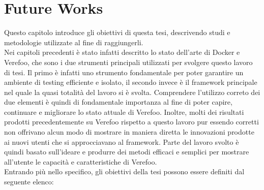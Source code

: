 \chapter{Future Works} \label{ch:FutureWorks}

Questo capitolo introduce gli obiettivi di questa tesi, descrivendo studi e metodologie utilizzate al fine di raggiungerli.\\
Nei capitoli precedenti è stato infatti descritto lo stato dell'arte di Docker e Verefoo, che sono i due strumenti principali utilizzati per
svolgere questo lavoro di tesi. Il primo è infatti uno strumento fondamentale per poter garantire un ambiente di testing efficiente e isolato, il secondo
invece è il framework principale nel quale la quasi totalità del lavoro si è svolta. Comprendere l'utilizzo correto dei due elementi è quindi di fondamentale importanza al fine di 
poter capire, continuare e migliorare lo stato attuale di Verefoo. Inoltre, molti dei risultati prodotti precedentemente su Verefoo rispetto a questo lavoro pur essendo corretti non
offrivano alcun modo di mostrare in maniera diretta le innovazioni prodotte ai nuovi utenti che si approcciavano al framework. Parte del lavoro svolto è quindi basato sull'ideare e produrre
dei metodi efficaci e semplici per mostrare all'utente le capacità e caratteristiche di Verefoo.\\
Entrando più nello specifico, gli obiettivi della tesi possono essere definiti dal seguente elenco:


